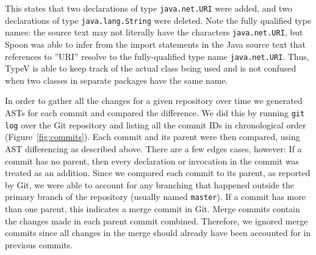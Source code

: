 \documentclass[conference]{IEEEtran}
\begin{document}
This states that two declarations of type \texttt{java.net.URI} were added, and two declarations of type \texttt{java.lang.String} were deleted. Note the fully qualified type names: the source text may not literally have the characters \texttt{java.net.URI}, but Spoon was able to infer from the import statements in the Java source text that references to ''URI'' resolve to the fully-qualified type name \texttt{java.net.URI}. Thus, TypeV is able to keep track of the actual class being used and is not confused when two classes in separate packages have the same name.

In order to gather all the changes for a given repository over time we generated ASTs for each commit and compared the difference. We did this by running \texttt{git log} over the Git repository and listing all the commit IDs in chronological order (Figure~\ref{fig:commits}). Each commit and its parent were then compared, using AST differencing as described above. There are a few edges cases, however: If a commit has no parent, then every declaration or invocation in the commit was treated as an addition. Since we compared each commit to its parent, as reported by Git, we were able to account for any branching that happened outside the primary branch of the repository (usually named \texttt{master}). If a commit has more than one parent, this indicates a merge commit in Git. Merge commits contain the changes made in each parent commit combined. Therefore, we ignored merge commits since all changes in the merge should already have been accounted for in previous commits.
\end{document}
